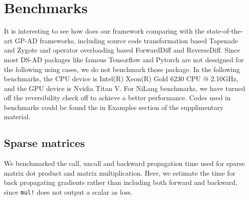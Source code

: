 \documentclass{article}
\newcommand{\<}{\langle}
\renewcommand{\>}{\rangle}
\newcommand{\ra}[1]{\renewcommand{\arraystretch}{#1}}
\theoremstyle{definition}\newtheorem{definition}{\textit{Definition}}
\begin{document}
\section{Benchmarks}\label{sec:benchmark}

It is interesting to see how does our framework comparing with the state-of-the-art GP-AD frameworks, including source code transformation based Tapenade and Zygote and operator overloading based ForwardDiff and ReverseDiff.
Since most DS-AD packages like famous Tensorflow and Pytorch are not dessigned for the following using cases, we do not benchmark those package.
In the following benchmarks, the CPU device is Intel(R) Xeon(R) Gold 6230 CPU @ 2.10GHz, and the GPU device is Nvidia Titan V.
For NiLang benchmarks, we have turned off the reversibility check off to achieve a better performance. Codes used in benchmarks could be found the in Examples section of the supplimentary material.

\subsection{Sparse matrices}\label{sec:benchsparse}
We benchmarked the call, uncall and backward propagation time used for sparse matrix dot product and matrix multiplication.
Here, we estimate the time for back propagating gradients rather than including both forward and backward, since \texttt{mul!} does not output a scalar as loss.

\begin{table}[h!]\centering
\begin{minipage}{0.8\columnwidth}
\ra{1.3}
    \caption{Absolute runtimes in seconds for computing the objectives (O) and the backward pass (B) of sparse matrix operations. The matrix size is $1000 \times 1000$, and the element density is $0.05$. The total time used in computing gradient can be estimated by summing ``O'' and ``B''.
    }\label{tbl:sparse}
\end{minipage}
\end{table}
\end{document}
